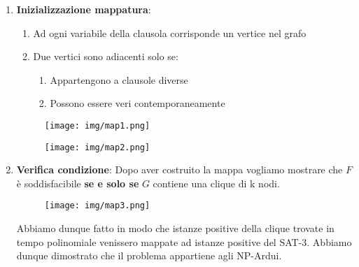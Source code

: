 \documentclass{article}
\begin{document}
\begin{enumerate}
    \item \textbf{Inizializzazione mappatura}:
    \begin{enumerate}
        \item Ad ogni variabile della clausola corrisponde un vertice nel grafo
        \item Due vertici sono adiacenti solo se:
        \begin{enumerate}
            \item Appartengono a clausole diverse
            \item Possono essere veri contemporaneamente
        \end{enumerate}
    \end{enumerate}

    \begin{figure}[htbp]
        \center
        \texttt{[image: img/map1.png]}
    \end{figure}
    
    \begin{figure}[htbp]
        \center
        \texttt{[image: img/map2.png]}
    \end{figure}
    
    \item \textbf{Verifica condizione}: Dopo aver costruito la mappa vogliamo mostrare che $F$ è soddisfacibile \textbf{se e solo se} $G$ contiene una clique di k nodi.

    \begin{figure}[htbp]
        \center
        \texttt{[image: img/map3.png]}
    \end{figure}

    Abbiamo dunque fatto in modo che istanze positive della clique trovate in tempo polinomiale venissero mappate ad istanze positive del SAT-3. Abbiamo dunque dimostrato che il problema appartiene agli NP-Ardui.
    
\end{enumerate}

\newpage
\end{document}
